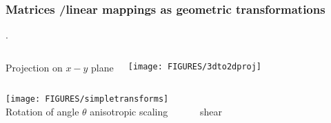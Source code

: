 \documentclass[8pt,dvipsnames]{beamer}
\begin{document}
\begin{frame}
  \frametitle{Matrices /linear mappings as geometric transformations}. 
  \begin{columns}
    \begin{center}
    Projection  on $x-y$ plane
    \end{center}
    \texttt{[image: FIGURES/3dto2dproj]}
  \end{columns}
  \begin{center}
    \texttt{[image: FIGURES/simpletransforms]}\\
    Rotation of angle $\theta$ \hfill anisotropic scaling \hfill ~~~~~~shear~~~~~~~~~~~
  \end{center}
\end{frame}
\end{document}
